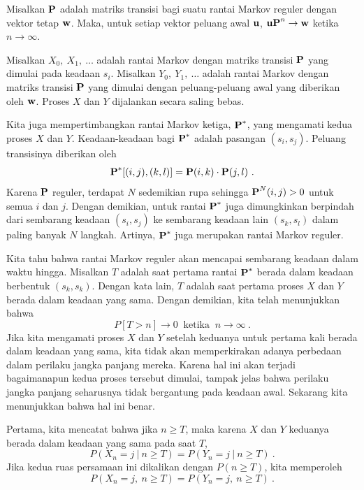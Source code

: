 \begin{theorem}\label{thm 11.4.1}
Misalkan ${\mbox{\bf P}\/}$ adalah matriks transisi bagi suatu rantai Markov reguler
dengan vektor tetap
${\mbox{\bf w}\/}$. Maka, untuk setiap vektor peluang awal ${\mbox{\bf u}\/}$,
${\mbox{\bf uP}\/}^n \rightarrow {\mbox{\bf w}\/}$ ketika $n \rightarrow \infty.$

\proof Misalkan $ X_0,\ X_1,\ \ldots$ adalah rantai Markov
dengan matriks transisi ${\mbox{\bf P}\/}$ yang dimulai pada keadaan $s_i$. Misalkan
$Y_0,\ Y_1,\ \ldots$ adalah rantai Markov
dengan matriks transisi ${\mbox{\bf P}\/}$ yang dimulai dengan peluang-peluang awal
yang diberikan oleh
${\mbox{\bf w}\/}$. Proses $X$ dan $Y$ dijalankan secara saling bebas.
\par
Kita juga mempertimbangkan rantai Markov ketiga, ${\mbox{\bf P}\/}^*$, yang mengamati
kedua proses
$X$ dan $Y$. Keadaan-keadaan bagi ${\mbox{\bf P}\/}^*$
adalah pasangan $(s_i, s_j)$. Peluang transisinya diberikan oleh
$${\mbox{\bf P}\/}^{*}[(i,j),(k,l)] = {\mbox{\bf P}\/}(i,k) \cdot  {\mbox{\bf P}\/}(j,l)\ .$$   
Karena ${\mbox{\bf P}\/}$ reguler, terdapat $N$ sedemikian rupa sehingga
${\mbox{\bf P}\/}^{N}(i,j) > 0$ untuk semua $i$
dan
$j$. Dengan demikian, untuk rantai
${\mbox{\bf P}\/}^*$ juga dimungkinkan berpindah dari sembarang keadaan $(s_i, s_j)$ ke
sembarang keadaan lain
$(s_k,s_l)$ dalam paling banyak $N$ langkah. Artinya, ${\mbox{\bf P}\/}^*$ juga merupakan
rantai Markov reguler.
\par
Kita tahu bahwa rantai Markov reguler akan mencapai sembarang keadaan dalam
waktu hingga. Misalkan $T$ adalah
saat pertama rantai ${\mbox{\bf P}\/}^*$ berada dalam keadaan berbentuk $(s_k,s_k)$.
Dengan kata lain,
$T$ adalah saat pertama proses $X$ dan $Y$ berada dalam keadaan yang sama.
Dengan demikian, kita telah menunjukkan bahwa
$$
P[T > n] \rightarrow 0 \;\;\mbox{ketika}\;\; n \rightarrow \infty\ .
$$
Jika kita mengamati proses $X$ dan $Y$ setelah keduanya untuk pertama kali
berada dalam keadaan yang sama, kita tidak akan memperkirakan adanya perbedaan
dalam perilaku jangka panjang mereka. Karena hal ini akan
terjadi bagaimanapun kedua proses tersebut dimulai, tampak jelas bahwa perilaku
jangka panjang
seharusnya tidak bergantung pada keadaan awal. Sekarang kita menunjukkan bahwa
hal ini benar.
\par
Pertama, kita mencatat bahwa jika $n \ge T$, maka karena $X$ dan $Y$ keduanya
berada dalam keadaan yang sama pada saat $T$,
$$
P(X_n = j\ |\ n \ge T) = P(Y_n = j\ |\ n \ge T)\ .
$$
Jika kedua ruas persamaan ini dikalikan dengan $P(n \ge T)$, kita memperoleh
\begin{equation}
P(X_n = j,\ n \ge T) = P(Y_n = j,\ n \ge T)\ .
\label{eq 11.4.1}

\end{equation}
\end{theorem}
